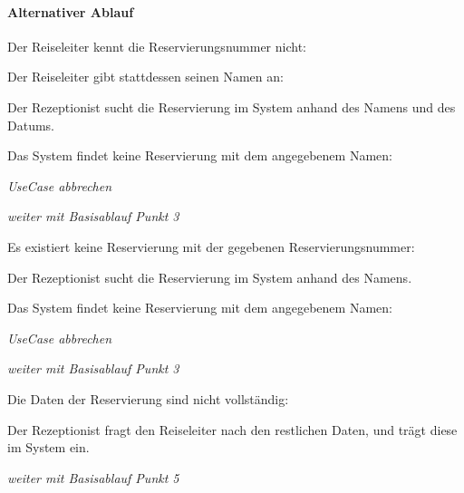 \paragraph{Alternativer Ablauf}
\begin{longenum}
	\item
	\begin{longenum}
		\item Der \Gls{Reiseleiter} kennt die Reservierungsnummer nicht:
		\begin{longenum}
			\item Der Reiseleiter gibt stattdessen seinen Namen an:
			\item Der \Gls{Rezeptionist} sucht die \Gls{Reservierung} im System anhand des Namens und des Datums.
			\begin{longenum}
				\item Das System findet keine \Gls{Reservierung} mit dem angegebenem Namen:
				\begin{longenum}
					\item \emph{UseCase abbrechen}
				\end{longenum}
			\end{longenum}
			\item \emph{weiter mit Basisablauf Punkt 3}
		\end{longenum}
	\end{longenum}
	\item
	\begin{longenum}
		\item Es existiert keine \Gls{Reservierung} mit der gegebenen \Gls{Reservierungsnummer}:
		\item Der \Gls{Rezeptionist} sucht die \Gls{Reservierung} im System anhand des Namens.
		\begin{longenum}
			\item Das System findet keine \Gls{Reservierung} mit dem angegebenem Namen:
			\begin{longenum}
				\item \emph{UseCase abbrechen}
			\end{longenum}
		\end{longenum}
		\item \emph{weiter mit Basisablauf Punkt 3}
	\end{longenum}
	\item
	\item
	\begin{longenum}
		\item Die Daten der \Gls{Reservierung} sind nicht vollständig:
		\begin{longenum}
			\item Der \Gls{Rezeptionist} fragt den \Gls{Reiseleiter} nach den restlichen Daten, und trägt diese im System ein.
			\item \emph{weiter mit Basisablauf Punkt 5}
		\end{longenum}
	\end{longenum}
	\item
	\item
	\item
\end{longenum}

